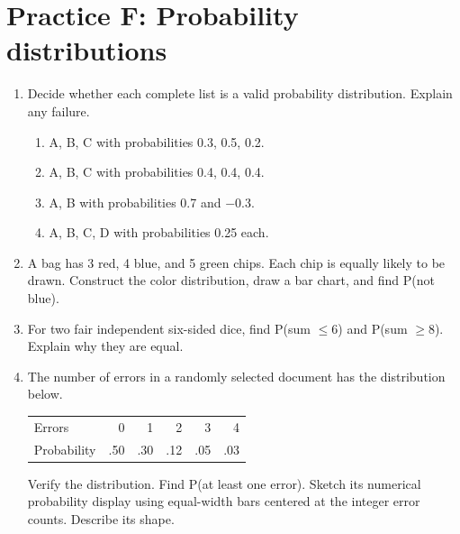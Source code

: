 \documentclass[12pt,letterpaper]{article}
\begin{document}
\section*{Practice F: Probability distributions}
\begin{enumerate}[label=F\arabic*.,leftmargin=2.5em,itemsep=10pt]
\item Decide whether each complete list is a valid probability distribution. Explain any failure.
\begin{enumerate}[label=(\alph*)]
\item A, B, C with probabilities 0.3, 0.5, 0.2.
\item A, B, C with probabilities 0.4, 0.4, 0.4.
\item A, B with probabilities 0.7 and $-0.3$.
\item A, B, C, D with probabilities 0.25 each.
\end{enumerate}
\item A bag has 3 red, 4 blue, and 5 green chips. Each chip is equally likely to be drawn. Construct the color distribution, draw a bar chart, and find P(not blue).
\item For two fair independent six-sided dice, find P(sum $\leq6$) and P(sum $\geq8$). Explain why they are equal.
\item The number of errors in a randomly selected document has the distribution below.
\begin{center}\begin{tabular}{lrrrrr}\toprule
Errors & 0 & 1 & 2 & 3 & 4\\
Probability & .50 & .30 & .12 & .05 & .03\\\bottomrule
\end{tabular}\end{center}
Verify the distribution. Find P(at least one error). Sketch its numerical probability display using equal-width bars centered at the integer error counts. Describe its shape.
\end{enumerate}

\end{document}
